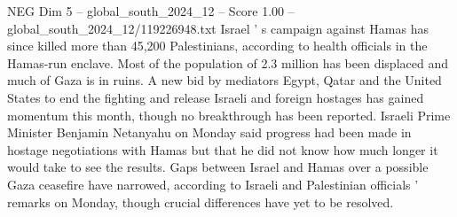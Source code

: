 \begin{textsample}{NEG Dim 5 – global\_south\_2024\_12 – Score 1.00 – global\_south\_2024\_12/119226948.txt}
Israel ' s campaign against Hamas has since killed more than 45,200 Palestinians, according to health officials in the Hamas-run enclave.
Most of the population of 2.3 million has been displaced and much of Gaza is in ruins.
A new bid by mediators Egypt, Qatar and the United States to end the fighting and release Israeli and foreign hostages has gained momentum this month, though no breakthrough has been reported.
Israeli Prime Minister Benjamin Netanyahu on Monday said progress had been made in hostage negotiations with Hamas but that he did not know how much longer it would take to see the results.
Gaps between Israel and Hamas over a possible Gaza ceasefire have narrowed, according to Israeli and Palestinian officials ' remarks on Monday, though crucial differences have yet to be resolved.

\end{textsample}
